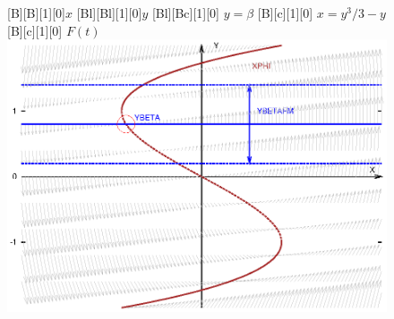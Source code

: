 \documentclass[12pt]{article}
\begin{document}
  
  
    \begin{figure}
      [B][B][1][0]{$x$}
      [Bl][Bl][1][0]{$y$}
      [Bl][Bc][1][0]{\color{blue} $y=\beta$}
      [B][c][1][0]{\color{Mahogany} $x=y^3/3-y$}
      [B][c][1][0]{\color{blue} $F(t)$}
      \includegraphics{vdp.eps}
    \end{figure}
  
    
\end{document}
